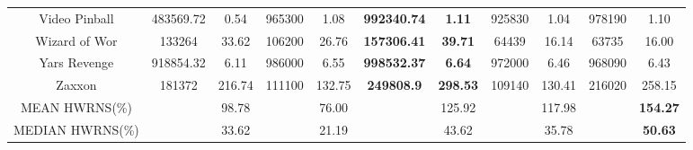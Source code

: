 \documentclass[nohyperref]{article}
\def\GDIHmeanHWRNS{154.27}
\def\GDIHmedianHWRNS{50.63}
\def\GDIImeanHWRNS{117.98}
\def\GDIImedianHWRNS{35.78}
\def\rtdtmeanHWRNS{98.78}
\def\rtdtmedianHWRNS{33.62}
\def\ngumeanHWRNS{76.00}
\def\ngumedianHWRNS{21.19}
\def\agentmeanHWRNS{125.92}
\def\agentmedianHWRNS{43.62}
\theoremstyle{plain}
\begin{document}
\begin{table}[!hb]
\begin{center}
\begin{tabular}{|c| c c| c c| c c| c c| c c| }
 Video Pinball      & 483569.72         & 0.54        & 965300          & 1.08           &\textbf{992340.74}    &\textbf{1.11}           &925830            &1.04            &978190          &1.10\\
 Wizard of Wor      & 133264            & 33.62       & 106200          & 26.76          &\textbf{157306.41}    &\textbf{39.71}          &64439             &16.14           &63735           &16.00\\
 Yars Revenge       & 918854.32         & 6.11        & 986000          & 6.55           &\textbf{998532.37}    &\textbf{6.64}           &972000            &6.46            &968090          &6.43\\
 Zaxxon             & 181372            & 216.74      & 111100          & 132.75         &\textbf{249808.9}     &\textbf{298.53}         &109140            &130.41          &216020          &258.15\\
\hline
MEAN HWRNS(\%)        &                   & \rtdtmeanHWRNS       &                 &  \ngumeanHWRNS         &                      & \agentmeanHWRNS           &                  & \GDIImeanHWRNS        &         & \textbf{\GDIHmeanHWRNS} \\
\hline
MEDIAN HWRNS(\%)      &                   &  \rtdtmedianHWRNS       &                 &  \ngumedianHWRNS      &                      &\agentmedianHWRNS &                  & \GDIImedianHWRNS          &         & \textbf{\GDIHmedianHWRNS} \\
\hline
\end{tabular}
\end{center}
\end{table}
\clearpage




 
\end{document}
